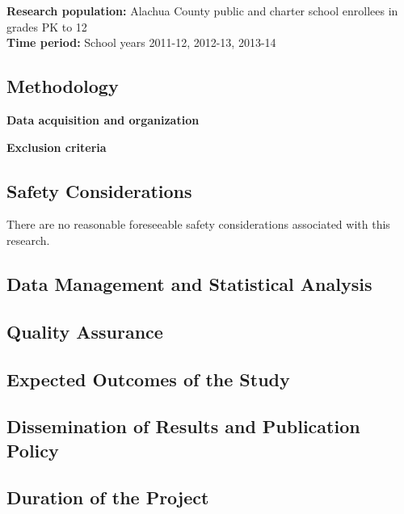\documentclass{article}
\begin{document}
\begin{multicols}{2}
\noindent \textbf{Research population:} Alachua County public and charter school enrollees in grades PK to 12 \\

\noindent \textbf{Time period:} School years 2011-12, 2012-13, 2013-14 


\subsection*{Methodology}

\noindent \textbf{Data acquisition and organization}\\

\blindtext

\noindent \textbf{Exclusion criteria}\\

\blindtext

\subsection*{Safety Considerations}

There are no reasonable foreseeable safety considerations associated with this research.  


\subsection*{Data Management and Statistical Analysis}

\blindtext


\blindtext


\subsection*{Quality Assurance}

\blindtext

\subsection*{Expected Outcomes of the Study}

\blindtext 

\subsection*{Dissemination of Results and Publication Policy}

\blindtext

\subsection*{Duration of the Project}


\end{multicols}
\end{document}
